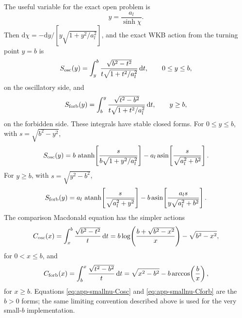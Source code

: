 \documentclass[11pt,a4paper]{article}
\newcommand{\dd}{\mathrm{d}}
\newcommand{\atanh}{\operatorname{atanh}}
\newcommand{\asin}{\operatorname{asin}}
\begin{document}
The useful variable for the exact open problem is
\begin{equation}
  y=\frac{a_l}{\sinh\chi}.
\end{equation}
Then \(\dd\chi=-\dd y/[y\sqrt{1+y^2/a_l^2}]\), and the exact WKB action from
the turning point \(y=b\) is
\begin{equation}
  S_{\rm osc}(y)=
  \int_y^b
  \frac{\sqrt{b^2-t^2}}{t\sqrt{1+t^2/a_l^2}}\,\dd t,\qquad 0\le y\le b,
  \label{eq:app-smallnu-true-osc}
\end{equation}
on the oscillatory side, and
\begin{equation}
  S_{\rm forb}(y)=
  \int_b^y
  \frac{\sqrt{t^2-b^2}}{t\sqrt{1+t^2/a_l^2}}\,\dd t,\qquad y\ge b,
  \label{eq:app-smallnu-true-forb}
\end{equation}
on the forbidden side.  These integrals have stable closed forms.  For
\(0\le y\le b\), with \(s=\sqrt{b^2-y^2}\),
\begin{equation}
  S_{\rm osc}(y)=
  b\,\atanh\!\left[
  \frac{s}{b\sqrt{1+y^2/a_l^2}}
  \right]
  -a_l\asin\!\left[
  \frac{s}{\sqrt{a_l^2+b^2}}
  \right].
  \label{eq:app-smallnu-Sosc}
\end{equation}
For \(y\ge b\), with \(s=\sqrt{y^2-b^2}\),
\begin{equation}
  S_{\rm forb}(y)=
  a_l\,\atanh\!\left[
  \frac{s}{\sqrt{a_l^2+y^2}}
  \right]
  -b\asin\!\left[
  \frac{a_l s}{y\sqrt{a_l^2+b^2}}
  \right].
  \label{eq:app-smallnu-Sforb}
\end{equation}
The comparison Macdonald equation has the simpler actions
\begin{equation}
  C_{\rm osc}(x)=
  \int_x^b\frac{\sqrt{b^2-t^2}}{t}\,\dd t
  =b\log\!\left(\frac{b+\sqrt{b^2-x^2}}{x}\right)
  -\sqrt{b^2-x^2},
  \label{eq:app-smallnu-Cosc}
\end{equation}
for \(0<x\le b\), and
\begin{equation}
  C_{\rm forb}(x)=
  \int_b^x\frac{\sqrt{t^2-b^2}}{t}\,\dd t
  =\sqrt{x^2-b^2}-b\arccos\!\left(\frac{b}{x}\right),
  \label{eq:app-smallnu-Cforb}
\end{equation}
for \(x\ge b\).
Equations \eqref{eq:app-smallnu-Cosc} and \eqref{eq:app-smallnu-Cforb} are
the \(b>0\) forms; the same limiting convention described above is used for
the very small-\(b\) implementation.
\end{document}
